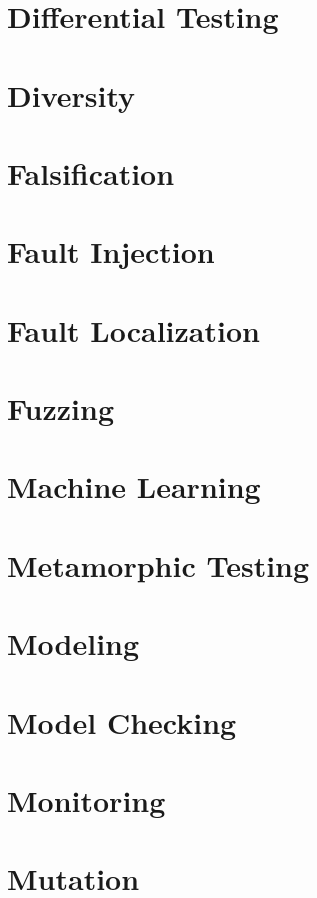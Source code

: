 \section{Differential Testing}

\section{Diversity}

\section{Falsification}

\section{Fault Injection}

\section{Fault Localization}

\section{Fuzzing}

\section{Machine Learning}

\section{Metamorphic Testing}

\section{Modeling}

\section{Model Checking}

\section{Monitoring}

\section{Mutation}

